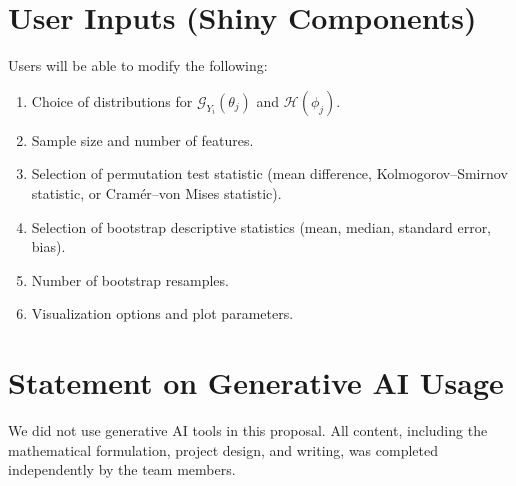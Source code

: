 \documentclass{article}
\begin{document}
\section{User Inputs (Shiny Components)}
Users will be able to modify the following:
\begin{enumerate}[itemsep=0pt, parsep=0pt, topsep=0pt]
    \item Choice of distributions for $\mathcal{G}_{Y_i}(\theta_j)$ and $\mathcal{H}(\phi_j)$.
    \item Sample size and number of features.
    \item Selection of permutation test statistic (mean difference, Kolmogorov–Smirnov statistic, or Cramér–von Mises statistic).
    \item Selection of bootstrap descriptive statistics (mean, median, standard error, bias).
    \item Number of bootstrap resamples.
    \item Visualization options and plot parameters.
\end{enumerate}

\nocite{*}



\section*{Statement on Generative AI Usage}
We did not use generative AI tools in this proposal. All content, including the mathematical formulation, project design, and writing, was completed independently by the team members.
\end{document}

